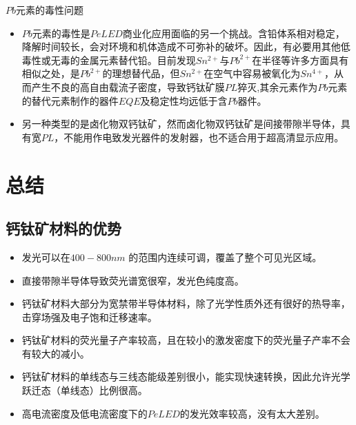 \documentclass{beamer}[fontset=windows]
\begin{document}
\begin{frame}
\begin{block}{$Pb$元素的毒性问题}
\begin{itemize}
\item $Pb$元素的毒性是$PeLED$商业化应用面临的另一个挑战。含铅体系相对稳定，降解时间较长，会对环境和机体造成不可弥补的破坏。因此，有必要用其他低毒性或无毒的金属元素替代铅。目前发现$Sn^{2+}$与$Pb^{2+}$在半径等许多方面具有相似之处，是$Pb^{2+}$的理想替代品，但$Sn^{2+}$在空气中容易被氧化为$Sn^{4+}$，从而产生不良的高自由载流子密度，导致钙钛矿膜$PL$猝灭,其余元素作为$Pb$元素的替代元素制作的器件$EQE$及稳定性均远低于含$Pb$器件。
\item 另一种类型的是卤化物双钙钛矿，然而卤化物双钙钛矿是间接带隙半导体，具有宽$PL$，不能用作电致发光器件的发射器，也不适合用于超高清显示应用。
\end{itemize}
\end{block}
\end{frame}
\section{总结}
\subsection{钙钛矿材料的优势}
\begin{frame}
\begin{itemize}
	\item 发光可以在$400-800 nm$ 的范围内连续可调，覆盖了整个可见光区域。
	\item 直接带隙半导体导致荧光谱宽很窄，发光色纯度高。
	\item 钙钛矿材料大部分为宽禁带半导体材料，除了光学性质外还有很好的热导率，击穿场强及电子饱和迁移速率。
	\item 钙钛矿材料的荧光量子产率较高，且在较小的激发密度下的荧光量子产率不会有较大的减小。
	\item 钙钛矿材料的单线态与三线态能级差别很小，能实现快速转换，因此允许光学跃迁态（单线态）比例很高。
	\item 高电流密度及低电流密度下的$PeLED$的发光效率较高，没有太大差别。
\end{itemize}
\end{frame}
\end{document}

